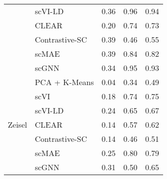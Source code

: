 \begin{tabular}{llrrr}
 &\cellcolor{red!10} scVI-LD &\cellcolor{red!10} 0.36 &\cellcolor{red!10} 0.96 &\cellcolor{red!10} 0.94 \\
 &\cellcolor{blue!10} CLEAR &\cellcolor{blue!10} 0.20 &\cellcolor{blue!10} 0.74 &\cellcolor{blue!10} 0.73 \\
 &\cellcolor{blue!10} Contrastive-SC &\cellcolor{blue!10} 0.39 &\cellcolor{blue!10} 0.46 &\cellcolor{blue!10} 0.55 \\
 &\cellcolor{blue!10} scMAE &\cellcolor{blue!10} 0.39 &\cellcolor{blue!10} 0.84 &\cellcolor{blue!10} 0.82 \\
 &\cellcolor{green!10} scGNN &\cellcolor{green!10} 0.34 &\cellcolor{green!10} 0.95 &\cellcolor{green!10} 0.93 \\
\cline{1-5}
\multirow[t]{7}{*}{Zeisel} &\cellcolor{red!10} PCA + K-Means &\cellcolor{red!10} 0.04 &\cellcolor{red!10} 0.34 &\cellcolor{red!10} 0.49 \\
 &\cellcolor{red!10} scVI &\cellcolor{red!10} 0.18 &\cellcolor{red!10} 0.74 &\cellcolor{red!10} 0.75 \\
 &\cellcolor{red!10} scVI-LD &\cellcolor{red!10} 0.24 &\cellcolor{red!10} 0.65 &\cellcolor{red!10} 0.67 \\
 &\cellcolor{blue!10} CLEAR &\cellcolor{blue!10} 0.14 &\cellcolor{blue!10} 0.57 &\cellcolor{blue!10} 0.62 \\
 &\cellcolor{blue!10} Contrastive-SC &\cellcolor{blue!10} 0.14 &\cellcolor{blue!10} 0.46 &\cellcolor{blue!10} 0.51 \\
 &\cellcolor{blue!10} scMAE &\cellcolor{blue!10} 0.25 &\cellcolor{blue!10} 0.80 &\cellcolor{blue!10} 0.79 \\
 &\cellcolor{green!10} scGNN &\cellcolor{green!10} 0.31 &\cellcolor{green!10} 0.50 &\cellcolor{green!10} 0.65 \\
\cline{1-5}
\bottomrule
\end{tabular}

